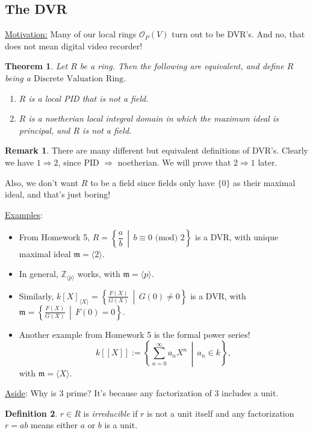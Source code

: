 \documentclass[12pt]{article}
\newcommand{\z}{\mathbb{Z}}
\newcommand{\ita}[1]{\textit{#1}}
\newcommand{\vbrack}[1]{\langle #1\rangle}
\newtheorem{theorem}{Theorem}[section]
\theoremstyle{definition}
\newtheorem{definition}[theorem]{Definition}
\newtheorem*{remark}{Remark}
\begin{document}
\subsection{The DVR}
\underline{Motivation:} Many of our local rings $\mathcal{O}_P(V)$ turn out to be DVR's. And no, that does not mean digital video recorder!
\begin{theorem}
    Let $R$ be a ring. Then the following are equivalent, and define $R$ being a $\mathrm{Discrete}$ $\mathrm{Valuation}$ $\mathrm{Ring}$.
    \begin{enumerate}
        \item $R$ is a local PID that is not a field.
        \item $R$ is a noetherian local integral domain in which the maximum ideal is principal, and $R$ is not a field.
    \end{enumerate}
\end{theorem}
\begin{remark}
   There are many different but equivalent definitions of DVR's. Clearly we have $1\Rightarrow2$, since PID $\Rightarrow$ noetherian. We will prove that $2\Rightarrow1$ later.
   
   Also, we don't want $R$ to be a field since fields only have $\{0\}$ as their maximal ideal, and that's just boring!
\end{remark}
\underline{Examples}:
\begin{itemize}
    \item From Homework 5, $R=\left\{\dfrac{a}{b}\,\middle|\,b\equiv0\text{ (mod) }2\right\}$ is a DVR, with unique maximal ideal $\mathfrak{m}=\vbrack{2}$.
    \item In general, $\z_{\vbrack{p}}$ works, with $\mathfrak{m}=\vbrack{p}$.
    \item Similarly, $k[X]_{\vbrack{X}}=\left\{\frac{F(X)}{G(X)}\,\middle|\,G(0)\neq0\right\}$ is a DVR, with $\mathfrak{m}=\left\{\frac{F(X)}{G(X)}\,\middle|\,F(0)=0\right\}$.
    \item Another example from Homework 5 is the formal power series!
    \[k[[X]]:=\left\{\sum\limits_{n=0}^{\infty}a_nX^n\,\middle|\,a_n\in k\right\},\]
    with $\mathfrak{m}=\vbrack{X}$.
\end{itemize}
\underline{Aside}: Why is 3 prime? It's because any factorization of 3 includes a unit.
\begin{definition}
    $r\in R$ is \ita{irreducible} if $r$ is not a unit itself and any factorization $r=ab$ means either $a$ or $b$ is a unit.
\end{definition}
\end{document}
